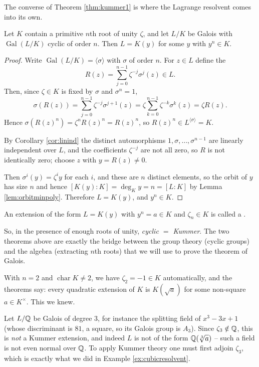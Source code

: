 \documentclass[a4paper]{scrartcl}
\newcommand{\charr}{\operatorname{char}}
\newcommand{\Gal}{\operatorname{Gal}}
\begin{document}
The converse of Theorem \ref{thm:kummer1} is where the Lagrange resolvent comes into its own.

\begin{theorem}\label{thm:kummer2}
	Let $K$ contain a primitive $n$th root of unity $\zeta$, and let $L/K$ be Galois with $\Gal(L/K)$ cyclic of order $n$. Then $L = K(y)$ for some $y$ with $y^n \in K$.
\end{theorem}

\begin{proof}
	Write $\Gal(L/K) = \langle\sigma\rangle$ with $\sigma$ of order $n$. For $z \in L$ define the 
	$$R(z) = \sum_{j=0}^{n-1}\zeta^{-j}\sigma^j(z) \in L.$$
	Then, since $\zeta \in K$ is fixed by $\sigma$ and $\sigma^n = 1$,
	$$\sigma(R(z)) = \sum_{j=0}^{n-1}\zeta^{-j}\sigma^{j+1}(z) = \zeta\sum_{k=0}^{n-1}\zeta^{-k}\sigma^k(z) = \zeta R(z).$$
	Hence $\sigma(R(z)^n) = \zeta^n R(z)^n = R(z)^n$, so $R(z)^n \in L^{\langle\sigma\rangle} = K$.

	By Corollary \ref{cor:linind} the distinct automorphisms $1, \sigma, \dots, \sigma^{n-1}$ are linearly independent over $L$, and the coefficients $\zeta^{-j}$ are not all zero, so $R$ is not identically zero; choose $z$ with $y = R(z) \neq 0$.

	Then $\sigma^i(y) = \zeta^i y$ for each $i$, and these are $n$ distinct elements, so the orbit of $y$ has size $n$ and hence $[K(y):K] = \deg_K y = n = [L:K]$ by Lemma \ref{lem:orbitminpoly}. Therefore $L = K(y)$, and $y^n \in K$.
\end{proof}

\begin{definition}
	An extension of the form $L = K(y)$ with $y^n = a \in K$ and $\zeta_n \in K$ is called a .
\end{definition}

So, in the presence of enough roots of unity, \emph{cyclic $=$ Kummer}. The two theorems above are exactly the bridge between the group theory (cyclic groups) and the algebra (extracting $n$th roots) that we will use to prove the theorem of Galois.

\begin{example}
	With $n=2$ and $\charr K \neq 2$, we have $\zeta_2 = -1 \in K$ automatically, and the theorems say: every quadratic extension of $K$ is $K(\sqrt a)$ for some non-square $a \in K^\times$. This we knew.
\end{example}

\begin{example}
	Let $L/\mathbb{Q}$ be Galois of degree $3$, for instance the splitting field of $x^3-3x+1$ (whose discriminant is $81$, a square, so its Galois group is $A_3$). Since $\zeta_3 \notin \mathbb{Q}$, this is \emph{not} a Kummer extension, and indeed $L$ is not of the form $\mathbb{Q}(\sqrt[3]{a})$ -- such a field is not even normal over $\mathbb{Q}$. To apply Kummer theory one must first adjoin $\zeta_3$, which is exactly what we did in Example \ref{ex:cubicresolvent}.
\end{example}
\end{document}
